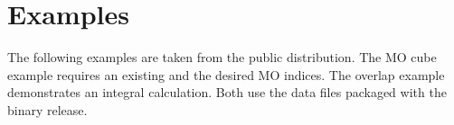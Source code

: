 \section{Examples}\label{sec-postorb-examples}
The following examples are taken from the public distribution. The MO cube example requires an existing  and the desired MO indices. The overlap example demonstrates an integral calculation. Both use the data files packaged with the binary release.






